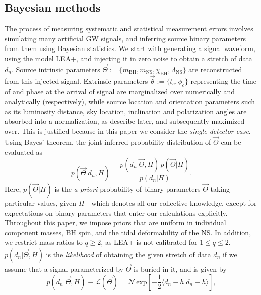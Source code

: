 \documentclass[aps,prd,amsmath,floats,floatfix, twocolumn,
superscriptaddress,nofootinbib,showpacs]{revtex4-1}
\newcommand{\lambdans}{\Lambda_\mathrm{NS}}
\newcommand{\chibh}{\chi_\mathrm{BH}}
\newcommand{\mbh}{m_\mathrm{BH}}
\newcommand{\mns}{m_\mathrm{NS}}
\newcommand{\LL}{\mathcal{L}}
\begin{document}
\subsection{Bayesian methods}\label{s2:bayesian}



The process of measuring systematic and statistical measurement errors
involves simulating many artificial GW signals, and inferring source binary
parameters from them using Bayesian statistics.
We start with generating a signal waveform, using the model LEA+, and injecting
it in zero noise to obtain a stretch of data $d_n$. Source intrinsic parameters
$\vec{\Theta}:=\{\mbh,\mns,\chibh,\lambdans\}$ are reconstructed from this
injected signal. Extrinsic parameters $\vec{\theta}:=\{t_c,\phi_c\}$ 
representing the time of and phase at the arrival of signal are marginalized
over numerically and analytically (respectively), while source location and
orientation parameters such as its luminosity distance, sky location, inclination
and polarization angles are absorbed into a normalization, as describe later,
and subsequently maximized over. This is justified because in this paper we
consider the {\it single-detector case}. Using Bayes' theorem, the joint inferred
probability  distribution of $\vec{\Theta}$ can be evaluated as
\begin{equation}\label{eq:postprob}
 p(\vec{\Theta} | d_n, H) = \dfrac{p(d_n|\vec{\Theta}, H)\,p(\vec{\Theta} | H)}{p(d_n|H)}.
\end{equation}
Here, $p(\vec{\Theta} | H)$ is the {\it a priori} probability of binary parameters
$\vec{\Theta}$
taking particular values, given $H$ - which denotes all our collective knowledge,
except for expectations on binary parameters that enter
our calculations explicitly. Throughout this paper, we impose priors that are
uniform in individual component masses, BH spin, and the tidal deformability of
the NS. In addition, we restrict mass-ratios to $q\geq 2$, as LEA+ is not
calibrated for $1\leq q\leq 2$. $p(d_n|\vec{\Theta}, H)$ is the {\it likelihood}
of obtaining the given stretch of data $d_n$ if we assume that a
signal parameterized by $\vec{\Theta}$ is buried in it, and is given by
\begin{equation}\label{eq:likelihood}
 p(d_n| \vec{\Theta}, H) \equiv \LL(\vec{\Theta}) = \mathcal{N}\, \mathrm{exp}[-\frac{1}{2} \langle d_n - h | d_n - h\rangle ],
\end{equation}
\end{document}

